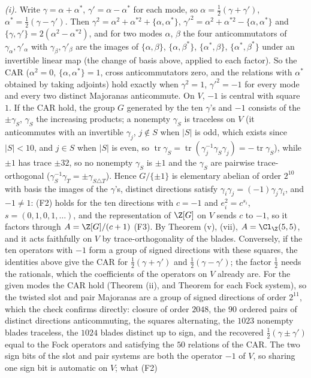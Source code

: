 \emph{(i).} Write $\gamma = \alpha + \alpha^{*}$, $\gamma' = \alpha - \alpha^{*}$ for each mode, so $\alpha = \tfrac12(\gamma + \gamma')$, $\alpha^{*} = \tfrac12(\gamma - \gamma')$. Then $\gamma^{2} = \alpha^{2} + \alpha^{*2} + \{\alpha, \alpha^{*}\}$, $\gamma'^{2} = \alpha^{2} + \alpha^{*2} - \{\alpha, \alpha^{*}\}$ and $\{\gamma, \gamma'\} = 2(\alpha^{2} - \alpha^{*2})$, and for two modes $\alpha$, $\beta$ the four anticommutators of $\gamma_{\alpha}, \gamma'_{\alpha}$ with $\gamma_{\beta}, \gamma'_{\beta}$ are the images of $\{\alpha, \beta\}$, $\{\alpha, \beta^{*}\}$, $\{\alpha^{*}, \beta\}$, $\{\alpha^{*}, \beta^{*}\}$ under an invertible linear map (the change of basis above, applied to each factor). So the CAR ($\alpha^{2} = 0$, $\{\alpha, \alpha^{*}\} = 1$, cross anticommutators zero, and the relations with $\alpha^{*}$ obtained by taking adjoints) hold exactly when $\gamma^{2} = 1$, $\gamma'^{2} = -1$ for every mode and every two distinct Majoranas anticommute. On $V$, $-1$ is central with square $1$. If the CAR hold, the group $G$ generated by the ten $\gamma$'s and $-1$ consists of the $\pm\gamma_{S}$, $\gamma_{S}$ the increasing products; a nonempty $\gamma_{S}$ is traceless on $V$ (it anticommutes with an invertible $\gamma_{j}$, $j \notin S$ when $|S|$ is odd, which exists since $|S| < 10$, and $j \in S$ when $|S|$ is even, so $\operatorname{tr}\gamma_{S} = \operatorname{tr}(\gamma_{j}^{-1}\gamma_{S}\gamma_{j}) = -\operatorname{tr}\gamma_{S}$), while $\pm1$ has trace $\pm32$, so no nonempty $\gamma_{S}$ is $\pm1$ and the $\gamma_{S}$ are pairwise trace-orthogonal ($\gamma_{S}^{-1}\gamma_{T} = \pm\gamma_{S \triangle T}$). Hence $G/\{\pm1\}$ is elementary abelian of order $2^{10}$ with basis the images of the $\gamma$'s, distinct directions satisfy $\gamma_{i}\gamma_{j} = (-1)\gamma_{j}\gamma_{i}$, and $-1 \ne 1$: (F2) holds for the ten directions with $c = -1$ and $e_{i}^{2} = c^{s_{i}}$, $s = (0, 1, 0, 1, \dots)$, and the representation of $\Z[G]$ on $V$ sends $c$ to $-1$, so it factors through $A = \Z[G]/(c + 1)$ (F3). By Theorem (v), (vii), $A = \Cl_{\Z}(5,5)$, and it acts faithfully on $V$ by trace-orthogonality of the blades. Conversely, if the ten operators with $-1$ form a group of signed directions with these squares, the identities above give the CAR for $\tfrac12(\gamma + \gamma')$ and $\tfrac12(\gamma - \gamma')$; the factor $\tfrac12$ needs the rationals, which the coefficients of the operators on $V$ already are. For the given modes the CAR hold (Theorem (ii), and Theorem  for each Fock system), so the twisted slot and pair Majoranas are a group of signed directions of order $2^{11}$, which the check confirms directly: closure of order $2048$, the $90$ ordered pairs of distinct directions anticommuting, the squares alternating, the $1023$ nonempty blades traceless, the $1024$ blades distinct up to sign, and the recovered $\tfrac12(\gamma \pm \gamma')$ equal to the Fock operators and satisfying the $50$ relations of the CAR. The two sign bits of the slot and pair systems are both the operator $-1$ of $V$, so sharing one sign bit is automatic on $V$; what (F2) 